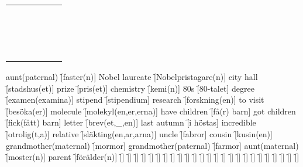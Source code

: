 \begin{center}
\begin{tabular}{|c c c c c c|}
         &  &  &  &  &  \\
         &  &  &  &  &  \\
         &  &  &  &  &  \\
         &  &  &  &  &  \\
         &  &  &  &  &  \\
         &  &  &  &  &  \\
         &  &  &  &  &  \\
         &  &  &  &  &  \\
         &  &  &  &  &  \\
         &  &  &  &  &  \\
         &  &  &  &  &  \\
         &  &  &  &  &  \\
         &  &  &  &  &  \\
         &  &  &  &  &  \\
         &  &  &  &  &  \\
         &  &  &  &  &  \\
        \hline
    \end{tabular}
\end{center}

\begin{questions}
    \begin{multicols}{2}
        \raggedcolumns
        \question aunt(paternal) \f[faster(n)]
        \question Nobel laureate \f[Nobelpristagare(n)]
        \question city hall \f[stadshus(et)]
        \question prize \f[pris(et)]
        \question chemistry \f[kemi(n)]
        \question 80s \f[80-talet]
        \question degree \f[examen(examina)]
        \question stipend \f[stipendium]
        \question research \f[forskning(en)]
        \question to visit \f[besöka(er)]
        \question molecule \f[molekyl(en,er,erna)]
        \question have children \f[få(r) barn]
        \question got children \f[fick(fått) barn]
        \question letter \f[brev(et,\_,en)]
        \question last autumn \f[i höstas]
        \question incredible \f[otrolig(t,a)]
        \question relative \f[släkting(en,ar,arna)]
        \question uncle \f[fabror]
        \question cousin \f[kusin(en)]
        \question grandmother(maternal) \f[mormor]
        \question grandmother(paternal) \f[farmor]
        \question aunt(maternal) \f[moster(n)]
        \question parent \f[förälder(n)]
        \question  \f[]
        \question  \f[]
        \question  \f[]
        \question  \f[]
        \question  \f[]
        \question  \f[]
        \question  \f[]
        \question  \f[]
        \question  \f[]
        \question  \f[]
        \question  \f[]
        \question  \f[]
        \question  \f[]
        \question  \f[]
        \question  \f[]
        \question  \f[]
        \question  \f[]
        \question  \f[]
        \question  \f[]
        \question  \f[]
        \question  \f[]
        \question  \f[]
        \question  \f[]
        \question  \f[]
        \question  \f[]
    \end{multicols}
\end{questions}
